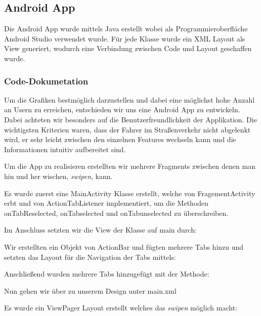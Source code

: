 \subsection{Android App}

Die Android App wurde mittels Java erstellt wobei als Programmieroberfläche Android Studio verwendet wurde.
Für jede Klasse wurde ein XML Layout als View generiert, wodurch eine Verbindung zwischen Code und Layout geschaffen wurde.

\subsubsection{Code-Dokumetation}

 Um die Grafiken bestmöglich darzustellen und dabei eine möglichst hohe Anzahl an Usern zu erreichen, entschieden wir uns eine Android App zu entwickeln.
 Dabei achteten wir besonders auf die Benutzerfreundlichkeit der Applikation.
 Die wichtigsten Kriterien waren, dass der Fahrer im Straßenverkehr nicht abgelenkt wird, er sehr leicht zwischen den einzelnen Features wechseln kann und die Informationen intuitiv aufbereitet sind.
 
 Um die App zu realisieren erstellten wir mehrere Fragments zwischen denen man hin und her wischen, \textit{swipen}, kann.
 

 Es wurde zuerst eine MainActivity Klasse erstellt, welche von FragementActivity erbt und von ActionTabListener implementiert, um die Methoden onTabReselected, onTabselected und onTabunselected zu überschreiben.   
 
            
Im Anschluss setzten wir die View der Klasse auf main durch:  



Wir erstellten ein Objekt von ActionBar und fügten mehrere Tabs hinzu und setzten das Layout für die Navigation der Tabs mittels:



Anschließend wurden mehrere Tabs hinzugefügt mit der Methode:




Nun gehen wir über zu unserem Design unter main.xml

Es wurde ein ViewPager Layout erstellt welches das \textit{swipen} möglich macht:

